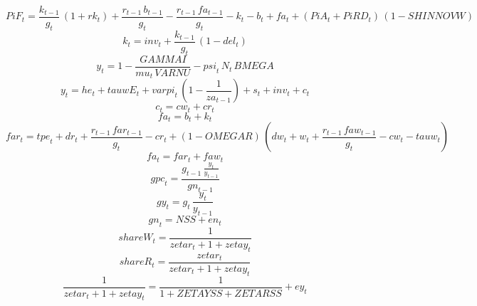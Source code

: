 \begin{dmath}
{PiF}_{t}=\frac{{k}_{t-1}}{{g}_{t}}\, \left(1+{rk}_{t}\right)+\frac{{r}_{t-1}\, {b}_{t-1}}{{g}_{t}}-\frac{{r}_{t-1}\, {fa}_{t-1}}{{g}_{t}}-{k}_{t}-{b}_{t}+{fa}_{t}+\left({PiA}_{t}+{PiRD}_{t}\right)\, \left(1-{SHINNOVW}\right)
\end{dmath}
\begin{dmath}
{k}_{t}={inv}_{t}+\frac{{k}_{t-1}}{{g}_{t}}\, \left(1-{del}_{t}\right)
\end{dmath}
\begin{dmath}
{y}_{t}=1-\frac{{GAMMAI}}{{mu}_{t}\, {VARNU}}-{psi}_{t}\, {N}_{t}\, {BMEGA}
\end{dmath}
\begin{dmath}
{y}_{t}={he}_{t}+{tauwE}_{t}+{varpi}_{t}\, \left(1-\frac{1}{{za}_{t-1}}\right)+{s}_{t}+{inv}_{t}+{c}_{t}
\end{dmath}
\begin{dmath}
{c}_{t}={cw}_{t}+{cr}_{t}
\end{dmath}
\begin{dmath}
{fa}_{t}={b}_{t}+{k}_{t}
\end{dmath}
\begin{dmath}
{far}_{t}={tpe}_{t}+{dr}_{t}+\frac{{r}_{t-1}\, {far}_{t-1}}{{g}_{t}}-{cr}_{t}+\left(1-{OMEGAR}\right)\, \left({dw}_{t}+{w}_{t}+\frac{{r}_{t-1}\, {faw}_{t-1}}{{g}_{t}}-{cw}_{t}-{tauw}_{t}\right)
\end{dmath}
\begin{dmath}
{fa}_{t}={far}_{t}+{faw}_{t}
\end{dmath}
\begin{dmath}
{gpc}_{t}=\frac{{g}_{t-1}\, \frac{{y}_{t}}{{y}_{t-1}}}{{gn}_{t-1}}
\end{dmath}
\begin{dmath}
{gy}_{t}={g}_{t}\, \frac{{y}_{t}}{{y}_{t-1}}
\end{dmath}
\begin{dmath}
{gn}_{t}={NSS}+{en}_{t}
\end{dmath}
\begin{dmath}
{shareW}_{t}=\frac{1}{{zetar}_{t}+1+{zetay}_{t}}
\end{dmath}
\begin{dmath}
{shareR}_{t}=\frac{{zetar}_{t}}{{zetar}_{t}+1+{zetay}_{t}}
\end{dmath}
\begin{dmath}
\frac{1}{{zetar}_{t}+1+{zetay}_{t}}=\frac{1}{1+{ZETAYSS}+{ZETARSS}}+{ey}_{t}
\end{dmath}

